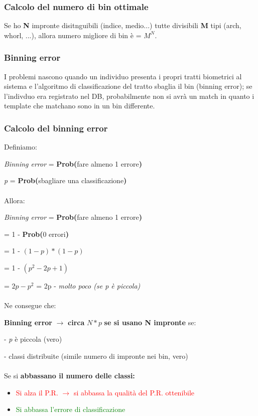 \subsubsection{Calcolo del numero di bin ottimale}

Se ho \textbf{N} impronte disitnguibili (indice, medio...) tutte divisibili \textbf{M} tipi (arch, whorl, ...), allora 
numero migliore di bin è = \textbf{$M^N$}.

\subsubsection{Binning error}

I  problemi nascono quando un individuo presenta i propri
tratti biometrici al sistema e l’algoritmo di classificazione
del tratto sbaglia il bin (binning error); se l'indivduo era registrato nel DB, probabilmente non si avrà un match in quanto i template che matchano sono in un bin differente.

\newpage

\subsubsection{Calcolo del binning error}

Definiamo:

\textit{Binning error} = \textbf{Prob(}fare almeno 1 errore\textbf{)}

\textit{p} = \textbf{Prob(}sbagliare una classificazione\textbf{)} \\\\
Allora:

\textit{Binning error} = \textbf{Prob(}fare almeno 1 errore\textbf{)}

= 1 - \textbf{Prob(}0 errori\textbf{)}

= 1 - $(1-p)*(1-p)$

= 1 - $(p^2-2p+1)$

= $2p - p^2$ = 2p - \textit{molto poco (se p è piccola)}
\\
\\
Ne consegue che:

\textbf{Binning error} $\rightarrow$ \textbf{circa} $N*p$ \textbf{se si usano N impronte} se:

- \textit{p} è piccola (vero)

- classi distribuite (simile numero di impronte nei bin, vero)\\\\
Se si \textbf{abbassano il numero delle classi:}
\begin{itemize}
    \item \textcolor{red}{Si alza il P.R. $\rightarrow$ si abbassa la qualità del P.R. ottenibile}
    \item \textcolor{green}{Si abbassa l'errore di classificazione}
\end{itemize}


